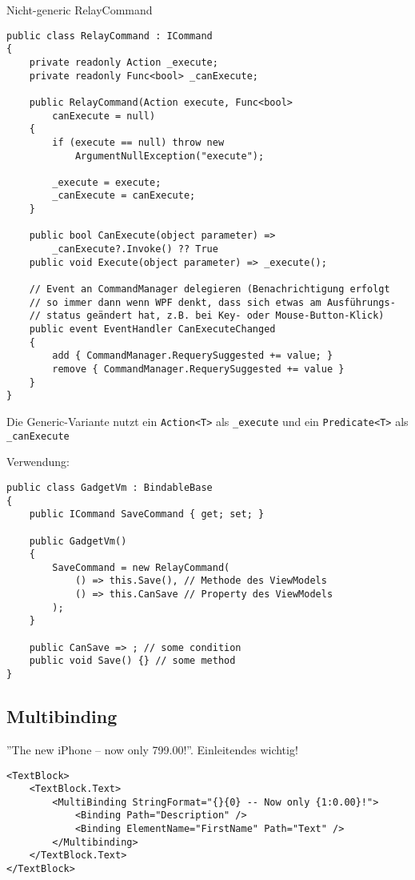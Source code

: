 Nicht-generic RelayCommand
\begin{lstlisting}
public class RelayCommand : ICommand
{
    private readonly Action _execute;
    private readonly Func<bool> _canExecute;
    
    public RelayCommand(Action execute, Func<bool> 
        canExecute = null)
    {
        if (execute == null) throw new 
            ArgumentNullException("execute");
        
        _execute = execute;
        _canExecute = canExecute;
    }
    
    public bool CanExecute(object parameter) => 
        _canExecute?.Invoke() ?? True
    public void Execute(object parameter) => _execute();
    
    // Event an CommandManager delegieren (Benachrichtigung erfolgt
    // so immer dann wenn WPF denkt, dass sich etwas am Ausführungs- 
    // status geändert hat, z.B. bei Key- oder Mouse-Button-Klick)
    public event EventHandler CanExecuteChanged
    {
        add { CommandManager.RequerySuggested += value; }
        remove { CommandManager.RequerySuggested += value }
    }
}
\end{lstlisting}

Die Generic-Variante nutzt ein \texttt{Action<T>} als \texttt{_execute} und ein \texttt{Predicate<T>} als \texttt{_canExecute}

Verwendung:

\begin{lstlisting}
public class GadgetVm : BindableBase
{
    public ICommand SaveCommand { get; set; }
    
    public GadgetVm()
    {
        SaveCommand = new RelayCommand(
            () => this.Save(), // Methode des ViewModels
            () => this.CanSave // Property des ViewModels
        );
    }
    
    public CanSave => ; // some condition
    public void Save() {} // some method
}
\end{lstlisting}

\subsection{Multibinding}
''The new iPhone -- now only 799.00!''. Einleitendes \code{{}} wichtig!

\begin{lstlisting}
<TextBlock>
    <TextBlock.Text>
        <MultiBinding StringFormat="{}{0} -- Now only {1:0.00}!">
            <Binding Path="Description" />
            <Binding ElementName="FirstName" Path="Text" />
        </Multibinding>
    </TextBlock.Text>
</TextBlock>
\end{lstlisting}

